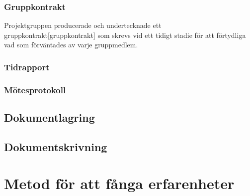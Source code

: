 \subsubsection*{Gruppkontrakt}
Projektgruppen producerade och undertecknade ett gruppkontrakt[gruppkontrakt] som skrevs vid ett tidigt stadie för att förtydliga vad som förväntades av varje gruppmedlem.

\subsubsection*{Tidrapport}

\subsubsection*{Mötesprotokoll}

\subsection{Dokumentlagring}

\subsection{Dokumentskrivning}

\section{Metod för att fånga erfarenheter}




